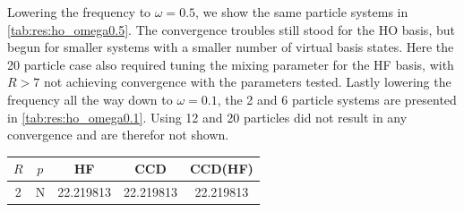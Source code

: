 Lowering the frequency to $\omega = 0.5$, we show the same particle systems in \cref{tab:res:ho_omega0.5}. The convergence troubles still stood for the HO basis, but begun for smaller systems with a smaller number of virtual basis states. Here the 20 particle case also required tuning the mixing parameter for the HF basis, with $R > 7$ not achieving convergence with the parameters tested.
Lastly lowering the frequency all the way down to $\omega = 0.1$, the 2 and 6 particle systems are presented in \cref{tab:res:ho_omega0.1}. Using 12 and 20 particles did not result in any convergence and are therefor not shown.
\clearpage
\begin{table}
    \hfill
    \begin{subtable}[h]{0.45\textwidth}
        \centering
        \begin{tabular}{ccccc}
            \toprule
            $R$ & $p$ & HF & CCD & CCD(HF) \\
            \midrule
            2 & N & 22.219813 & 22.219813 & 22.219813 \\

\end{tabular}
\end{subtable}
\end{table}
